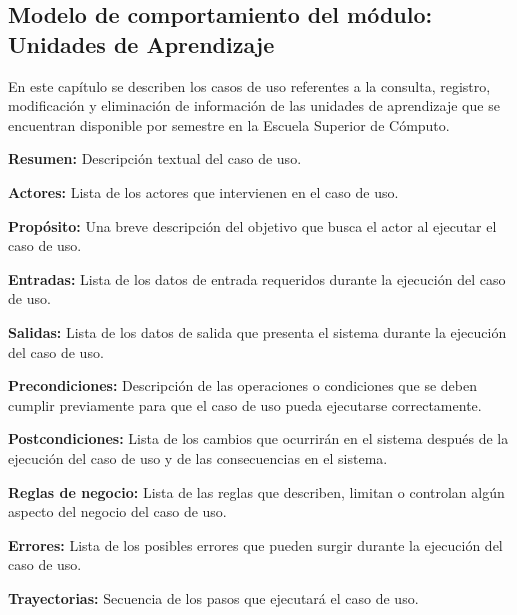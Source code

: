 \newpage
\subsection{Modelo de comportamiento del módulo: Unidades de Aprendizaje \label{chp:modeloComportamientoUnidadesDeAprendizaje}}

En este capítulo se describen los casos de uso referentes a la consulta, registro, modificación y eliminación de información de las unidades de aprendizaje que se encuentran disponible por semestre en la Escuela Superior de Cómputo. \bigskip

\begin{objetivos}
	\item {\bf Resumen:} Descripción textual del caso de uso.
	\item {\bf Actores:} Lista de los actores que intervienen en el caso de uso.
	\item {\bf Propósito:} Una breve descripción del objetivo que busca el actor al ejecutar el caso de uso.
	\item {\bf Entradas:} Lista de los datos de entrada requeridos durante la ejecución del caso de uso.
	\item {\bf Salidas:} Lista de los datos de salida que presenta el sistema durante la ejecución del caso de uso.
	\item {\bf Precondiciones:} Descripción de las operaciones o condiciones que se deben cumplir previamente para que el caso de uso pueda ejecutarse correctamente.
	\item {\bf Postcondiciones:} Lista de los cambios que ocurrirán en el sistema después de la ejecución del caso de uso y de las consecuencias en el sistema.
	\item {\bf Reglas de negocio:} Lista de las reglas que describen, limitan o controlan algún aspecto del negocio del caso de uso.
	\item {\bf Errores:} Lista de los posibles errores que pueden surgir durante la ejecución del caso de uso.
	\item {\bf Trayectorias:} Secuencia de los pasos que ejecutará el caso de uso.
\end{objetivos}

\newpage
